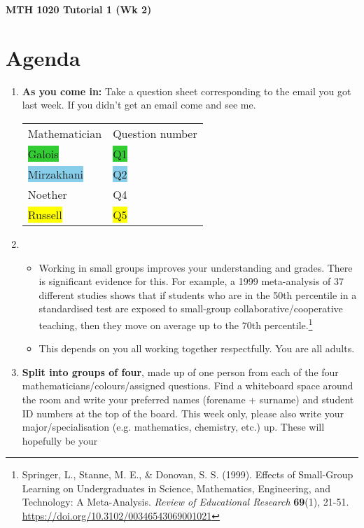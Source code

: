 \documentclass[a4paper,11pt]{article}
\begin{document}
  \begin{center}
    {\huge\textbf{MTH 1020 Tutorial 1 (Wk 2)}}
  \end{center}

  \section{Agenda}
  \begin{enumerate}
    \item \textbf{As you come in:} Take a question sheet corresponding to the email you got last week. If you didn't get an email come and see me.
    \begin{center}
    \begin{tabular}{ll}
      Mathematician & Question number\\
      \colorbox{LimeGreen}{Galois} & \colorbox{LimeGreen}{Q1}\\
      \colorbox{SkyBlue}{Mirzakhani} & \colorbox{SkyBlue}{Q2}\\
      \colorbox{VioletRed}{Noether} & \colorbox{VioletRed}{Q4}\\
      \colorbox{Yellow}{Russell} & \colorbox{Yellow}{Q5}
    \end{tabular}
    \end{center}
    \item
      \begin{itemize}
        \item Working in small groups improves your understanding and grades. There is significant evidence for this. For example, a 1999 meta-analysis of 37 different studies shows that
              if students who are in the 50th percentile in a standardised test are exposed to small-group collaborative/cooperative teaching, then they move on average
              up to the 70th percentile.\footnote{Springer, L., Stanne, M. E., \& Donovan, S. S. (1999). Effects of Small-Group Learning on Undergraduates in Science, Mathematics, Engineering, and Technology: A Meta-Analysis. \textit{Review of Educational Research} \textbf{69}(1), 21-51. \url{https://doi.org/10.3102/00346543069001021} }
        \item This depends on you all working together respectfully. You are all adults.
      \end{itemize}
    \item \textbf{Split into groups of four}, made up of one person from each of the four mathematicians/colours/assigned questions. Find a whiteboard space around the room  and write your preferred
          names (forename + surname) and student ID numbers at the top of the board. This week only, please also write your major/specialisation (e.g. mathematics, chemistry, etc.) up. These will hopefully be your

\end{enumerate}
\end{document}
